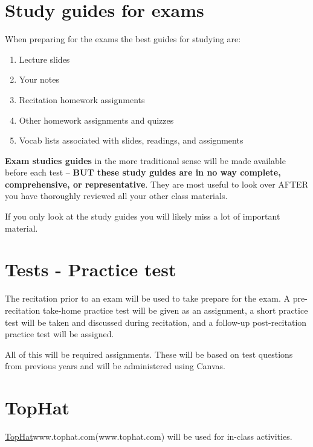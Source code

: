 \documentclass[
]{book}
\providecommand{\tightlist}{%
  \setlength{\itemsep}{0pt}\setlength{\parskip}{0pt}}
\begin{document}
\hypertarget{study-guides-for-exams}{%
\chapter{Study guides for exams}\label{study-guides-for-exams}}

When preparing for the exams the best guides for studying are:

\begin{enumerate}
\def\labelenumi{\arabic{enumi}.}
\tightlist
\item
  Lecture slides
\item
  Your notes
\item
  Recitation homework assignments
\item
  Other homework assignments and quizzes
\item
  Vocab lists associated with slides, readings, and assignments
\end{enumerate}

\textbf{Exam studies guides} in the more traditional sense will be made available before each test -- \textbf{BUT these study guides are in no way complete, comprehensive, or representative}. They are most useful to look over AFTER you have thoroughly reviewed all your other class materials.

If you only look at the study guides you will likely miss a lot of important material.

\hypertarget{tests---practice-test}{%
\chapter{Tests - Practice test}\label{tests---practice-test}}

The recitation prior to an exam will be used to take prepare for the exam. A pre-recitation take-home practice test will be given as an assignment, a short practice test will be taken and discussed during recitation, and a follow-up post-recitation practice test will be assigned.

All of this will be required assignments. These will be based on test questions from previous years and will be administered using Canvas.

\hypertarget{tophat}{%
\chapter{TopHat}\label{tophat}}

\protect\hyperlink{tophat}{TopHat}www.tophat.com(www.tophat.com) will be used for in-class activities.
\end{document}
